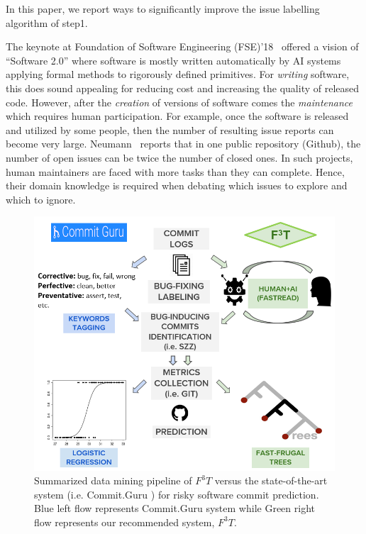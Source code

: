 \documentclass[sigconf,review, anonymous]{acmart}
\begin{document}
In this paper, we report ways to significantly
improve the issue labelling algorithm of step1.


The keynote at Foundation of Software Engineering (FSE)'18~\cite{meijer18} offered a vision of ``Software 2.0'' where software is mostly written automatically by AI systems applying formal methods to rigorously defined primitives. For {\em writing} software, this does sound appealing for reducing cost and increasing the quality of released code. However, after the {\em creation} of versions of software comes the {\em maintenance} which requires human participation.  For example, once the software is released and utilized by some people, then the number of resulting issue reports can become very large. Neumann~\cite{neumann13} reports that in one public repository (Github), the number of open issues can be twice the number of closed ones. In such projects, human maintainers are faced with more tasks than they can complete. Hence, their domain knowledge is required when debating which issues to explore and which to ignore.  


\begin{figure}[!t]
\includegraphics[width=\linewidth]{summary.PNG}
\vspace{-14pt}
\caption{Summarized data mining pipeline of $F^3T$ versus the state-of-the-art system (i.e. Commit.Guru \cite{commitguru}) for risky software commit prediction. Blue left flow represents Commit.Guru system while Green right flow represents our recommended system, $F^3T$.}\label{fig:system}
\vspace{-6mm}
\end{figure} 
\end{document}
